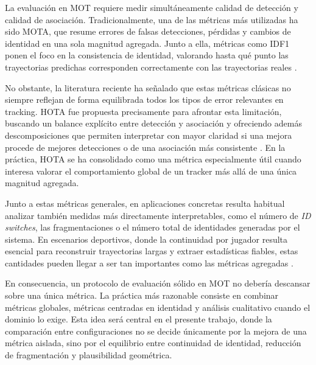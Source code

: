 \documentclass[../MAIN.tex]{subfiles}
\begin{document}
La evaluación en MOT requiere medir simultáneamente calidad de detección y calidad de asociación. Tradicionalmente, una de las métricas más utilizadas ha sido MOTA, que resume errores de falsas detecciones, pérdidas y cambios de identidad en una sola magnitud agregada. Junto a ella, métricas como IDF1 ponen el foco en la consistencia de identidad, valorando hasta qué punto las trayectorias predichas corresponden correctamente con las trayectorias reales \parencite{hota2020}.

No obstante, la literatura reciente ha señalado que estas métricas clásicas no siempre reflejan de forma equilibrada todos los tipos de error relevantes en tracking. HOTA fue propuesta precisamente para afrontar esta limitación, buscando un balance explícito entre detección y asociación y ofreciendo además descomposiciones que permiten interpretar con mayor claridad si una mejora procede de mejores detecciones o de una asociación más consistente \parencite{hota2020}. En la práctica, HOTA se ha consolidado como una métrica especialmente útil cuando interesa valorar el comportamiento global de un tracker más allá de una única magnitud agregada.

Junto a estas métricas generales, en aplicaciones concretas resulta habitual analizar también medidas más directamente interpretables, como el número de \textit{ID switches}, las fragmentaciones o el número total de identidades generadas por el sistema. En escenarios deportivos, donde la continuidad por jugador resulta esencial para reconstruir trayectorias largas y extraer estadísticas fiables, estas cantidades pueden llegar a ser tan importantes como las métricas agregadas \parencite{cioppa2022soccernettracking,hota2020}.

En consecuencia, un protocolo de evaluación sólido en MOT no debería descansar sobre una única métrica. La práctica más razonable consiste en combinar métricas globales, métricas centradas en identidad y análisis cualitativo cuando el dominio lo exige. Esta idea será central en el presente trabajo, donde la comparación entre configuraciones no se decide únicamente por la mejora de una métrica aislada, sino por el equilibrio entre continuidad de identidad, reducción de fragmentación y plausibilidad geométrica.


\newpage
\end{document}
